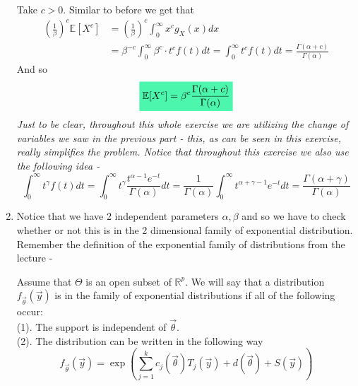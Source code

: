 \documentclass[../main.tex]{subfiles}
\begin{document}
\begin{enumerate}
Take $c>0$. Similar to before we get that
\begin{align*}
\left(\frac{1}{\beta}\right)^c \mathbb{E}[X^c]&=\left(\frac{1}{\beta}\right)^c
\int_0^\infty x^c g_X(x) dx
\\ &=\beta^{-c}\int_0^\infty \beta^c \cdot t^c f(t) dt = \int_0^\infty t^c f(t) dt =\frac{\Gamma(\alpha+c)}{\Gamma(\alpha)}
\end{align*}
And so
\[\mathcolorbox{goodcolor}{\mathbb{E}[X^c] = \beta^c \frac{\Gamma(\alpha+c)}{\Gamma(\alpha)}}\]
\emph{Just to be clear, throughout this whole exercise we are utilizing the change of variables we saw in the previous part - this, as can be seen in this exercise, really simplifies the problem.
Notice that throughout this exercise we also use the following idea -} 
\[\int_0^{\infty} t^{\gamma}f(t) dt = \int_0^{\infty} t^{\gamma}\frac{t^{\alpha-1}e^{-t}}{\Gamma(\alpha)} dt = \frac{1}{\Gamma(\alpha)} \int_0^{\infty} t^{\alpha+\gamma-1} e^{-t} dt = \frac{\Gamma(\alpha+\gamma)}{\Gamma(\alpha)}\]
\item
Notice that we have 2 independent parameters $\alpha,\beta$ and so we have to check whether or not this is in the 2 dimensional family of exponential distribution. Remember the definition of the exponential family of distributions from the lecture -  

\begin{mdframed}[backgroundcolor=blue!20] 
\begin{definition}
Assume that $\Theta$ is an open subset of $\mathbb{R}^p$. We will say that a distribution $f_{\overrightarrow{\theta}}(\overrightarrow{y})$ is in the family of exponential distributions if all of the following occur: \\
(1). The support is independent of $\overrightarrow{\theta}$.\\
(2). The distribution can be written in the following way
\[f_{\overrightarrow{\theta}}(\overrightarrow{y}) = \exp\left(\sum_{j=1}^k c_j(\overrightarrow{\theta})T_j(\overrightarrow{y}) + d(\overrightarrow{\theta}) + S(\overrightarrow{y})\right)\]
\end{definition}
\end{mdframed}


\end{enumerate}
\end{document}
